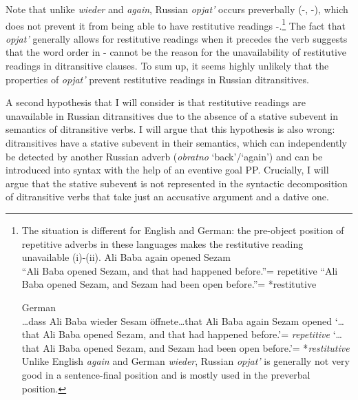 \documentclass[output=paper,modfonts,nonflat,
 hidelinks
]{langsci/langscibook}
\begin{document}
Note that unlike \textit{wieder} and \textit{again}, Russian \textit{opjat’} occurs preverbally (-, -), which does not prevent it from being able to have restitutive readings -.\footnote{The
  situation is different for English and German: the pre-object position of repetitive adverbs in these languages makes the restitutive reading unavailable (i)-(ii).
  \ea\label{ex:bondarenko:}
  {Ali Baba again opened Sezam}\\

    \ea
    “Ali Baba opened Sezam, and that had happened before.”= repetitive   
    \ex*“Ali Baba opened Sezam, and Sezam had been open before.”= *restitutive
    \z
    \z
    
  \ea\label{ex:bondarenko:}
  {German}\\

  …dass Ali Baba wieder Sesam öffnete…that Ali Baba again Sezam opened   
  \ea     ‘…that Ali Baba opened Sezam, and that had happened before.’= \textit{repetitive}   
  \ex     *‘…that Ali Baba opened Sezam, and Sezam had been open before.’= *\textit{restitutive}
  \z
  \z
  Unlike English \textit{again} and German \textit{wieder}, Russian \textit{opjat’} is generally not very good in a sentence-final position and is mostly used in the preverbal position.}%
The fact that \textit{opjat’} generally allows for restitutive readings when it precedes the verb suggests that the word order in - cannot be the reason for the unavailability of restitutive readings in ditransitive clauses. To sum up, it seems highly unlikely that the properties of \textit{opjat’} prevent restitutive readings in Russian ditransitives.



A second hypothesis that I will consider is that restitutive readings are unavailable in Russian ditransitives due to the absence of a stative subevent in semantics of ditransitive verbs. I will argue that this hypothesis is also wrong: ditransitives have a stative subevent in their semantics, which can independently be detected by another Russian adverb (\textit{obratno} ‘back’/‘again’) and can be introduced into syntax with the help of an eventive goal PP. Crucially, I will argue that the stative subevent is not represented in the syntactic decomposition of ditransitive verbs that take just an accusative argument and a dative one.
\end{document}
